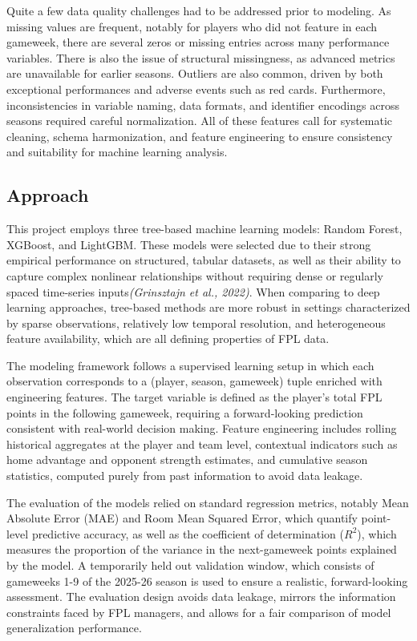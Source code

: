 \documentclass[11pt,a4paper]{article}
\begin{document}
Quite a few data quality challenges had to be addressed prior to modeling. As missing values are frequent, notably for players who did not feature in each gameweek, there are several zeros or missing entries across many performance variables. There is also the issue of structural missingness, as advanced metrics are unavailable for earlier seasons. Outliers are also common, driven by both exceptional performances and adverse events such as red cards. Furthermore, inconsistencies in variable naming, data formats, and identifier encodings across seasons required careful normalization. All of these features call for systematic cleaning, schema harmonization, and feature engineering to ensure consistency and suitability for machine learning analysis. 


\subsection{Approach}
This project employs three tree-based machine learning models: Random Forest, XGBoost, and LightGBM. These models were selected due to their strong empirical performance on structured, tabular datasets, as well as their ability to capture complex nonlinear relationships without requiring dense or regularly spaced time-series inputs\textit{(Grinsztajn et al., 2022)}. When comparing to deep learning approaches, tree-based methods are more robust in settings characterized by sparse observations, relatively low temporal resolution, and heterogeneous feature availability, which are all defining properties of FPL data. 

The modeling framework follows a supervised learning setup in which each observation corresponds to a (player, season, gameweek) tuple enriched with engineering features. The target variable is defined as the player’s total FPL points in the following gameweek, requiring a forward-looking prediction consistent with real-world decision making. Feature engineering includes rolling historical aggregates at the player and team level, contextual indicators such as home advantage and opponent strength estimates, and cumulative season statistics, computed purely from past information to avoid data leakage. 

The evaluation of the models relied on standard regression metrics, notably Mean Absolute Error (MAE) and Room Mean Squared Error, which quantify point-level predictive accuracy, as well as the coefficient of determination ($R^2$), which measures the proportion of the variance in the next-gameweek points explained by the model. A temporarily held out validation window, which consists of gameweeks 1-9 of the 2025-26 season is used to ensure a realistic, forward-looking assessment. The evaluation design avoids data leakage, mirrors the information constraints faced by FPL managers, and allows for a fair comparison of model generalization performance. 
\end{document}
